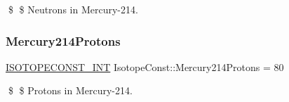 \$ \$ Neutrons in Mercury-\/214. \mbox{\label{group___isotope_const-_mercury-_hg214_ga1194fad6eb8f075364688c3b026dd50a}} 
\subsubsection{\texorpdfstring{Mercury214\+Protons}{Mercury214Protons}}
{\footnotesize\ttfamily \mbox{\hyperlink{group___isotope_const-_macros_ga5f18360b3e99483a35c32d789e62621c}{I\+S\+O\+T\+O\+P\+E\+C\+O\+N\+S\+T\+\_\+\+I\+NT}} Isotope\+Const\+::\+Mercury214\+Protons = 80}

\$ \$ Protons in Mercury-\/214. 